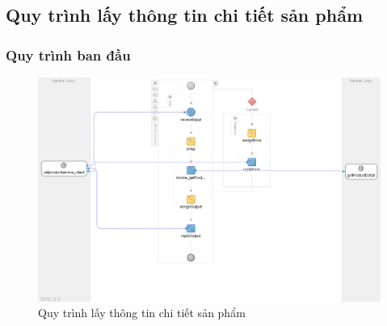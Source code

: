 \newpage

\subsection{Quy trình lấy thông tin chi tiết sản phẩm}
\subsubsection*{Quy trình ban đầu}
\begin{figure}[!htp]
    \centering
    \includegraphics[width=12cm]{img/bpel/productDetail.jpg}
    \newline
    \caption{Quy trình lấy thông tin chi tiết sản phẩm}
\end{figure}

\newpage
